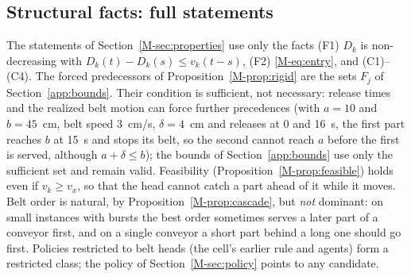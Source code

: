 \documentclass[11pt,a4paper]{article}
\theoremstyle{plain}
\theoremstyle{definition}
\theoremstyle{remark}
\begin{document}
\subsection{Structural facts: full statements}
The statements of Section~\ref{M-sec:properties} use only the facts (F1) $D_k$ is
non-decreasing with $D_k(t)-D_k(s)\le v_k(t-s)$, (F2) \eqref{M-eq:entry}, and (C1)--(C4). The
forced predecessors of Proposition~\ref{M-prop:rigid} are the sets $F_j$ of
Section~\ref{app:bounds}. Their condition is sufficient, not necessary: release times and the
realized belt motion can force further precedences (with $a=10$ and $b=45$~cm, belt speed
3~cm/s, $\delta=4$~cm and releases at 0 and 16~s, the first part reaches $b$ at 15~s and
stops its belt, so the second cannot reach $a$ before the first is served, although
$a+\delta\le b$); the bounds of Section~\ref{app:bounds} use only the sufficient set and
remain valid. Feasibility (Proposition~\ref{M-prop:feasible}) holds even if $v_k\ge v_x$, so
that the head cannot catch a part ahead of it while it moves.
Belt order is natural, by Proposition~\ref{M-prop:cascade}, but \emph{not} dominant: on small
instances with bursts the best order sometimes serves a later part of a conveyor first, and
on a single conveyor a short part behind a long one should go first. Policies restricted
to belt heads (the cell's earlier rule and agents) form a restricted class; the policy of
Section~\ref{M-sec:policy} points to any candidate.

\end{document}
